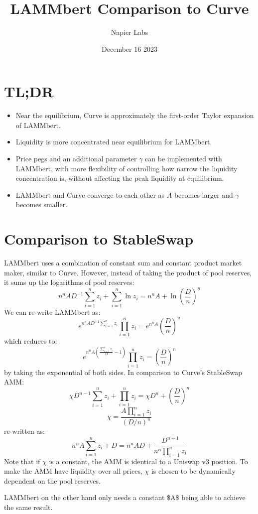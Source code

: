 \documentclass{article}
\title{LAMMbert Comparison to Curve}
\author{Napier Labs}
\date{December 16 2023}
\begin{document}
\maketitle

\section{TL;DR}
\begin{itemize}
    \item Near the equilibrium, Curve is approximately the first-order Taylor expansion of LAMMbert.
    \item Liquidity is more concentrated near equilibrium for LAMMbert.
    \item Price pegs and an additional parameter $\gamma$ can be implemented with LAMMbert, with more flexibility of controlling how narrow the liquidity concentration is, without affecting the peak liquidity at equilibrium.
    \item LAMMbert and Curve converge to each other as $A$ becomes larger and $\gamma$ becomes smaller.
\end{itemize}

\section{Comparison to StableSwap}

LAMMbert uses a combination of constant sum and constant product market maker, similar to Curve. However, instead of taking the product of pool reserves, it sums up the logarithms of pool reserves:
$$n^nAD^{-1}\sum_{i=1}^nz_i+\sum_{i=1}^n\ln z_{i}=n^nA+\ln\left(\frac{D}{n}\right)^n$$
We can re-write LAMMbert as:
$$e^{n^nAD^{-1}\sum_{i=1}^nz_i}\prod_{i=1}^nz_{i}=e^{n^nA}\left(\frac{D}{n}\right)^n$$
which reduces to:
$$e^{n^nA\left(\frac{\sum_{i=1}^nz_i}{D}-1\right)}\prod_{i=1}^nz_i=\left(\frac{D}{n}\right)^n$$
by taking the exponential of both sides.
In comparison to Curve’s StableSwap AMM:
$$\chi D^{n-1}\sum_{i=1}^nz_i+\prod_{i=1}^nz_i=\chi D^n+\left(\frac{D}{n}\right)^n$$
$$\chi=\frac{A\prod_{i=1}^{n}z_{i}}{(D/n)^{n}}$$
re-written as:
$$n^nA\sum_{i=1}^n z_i+D=n^nAD+\frac{D^{n+1}}{n^n\prod_{i=1}^nz_i}$$
Note that if $\chi$ is a constant, the AMM is identical to a Uniswap v3 position. To make the AMM have liquidity over all prices, $\chi$ is chosen to be dynamically dependent on the pool reserves.

LAMMbert on the other hand only needs a constant \$A\$ being able to achieve the same result.
\end{document}
